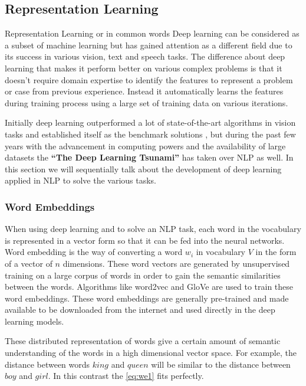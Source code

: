 \subsection{Representation Learning}\label{sec:dl}
Representation Learning or in common words Deep learning can be considered as a subset of machine learning but has gained attention as a different field due to its success in various vision, text and speech tasks. The difference about deep learning that makes it perform better on various complex problems is that it doesn't require domain expertise to identify the features to represent a problem or case from previous experience. Instead it automatically learns the features during training process using a large set of training data on various iterations. 

Initially deep learning outperformed a lot of state-of-the-art algorithms in vision tasks and established itself as the benchmark solutions \cite{simonyan2014very,he2016deep}, but during the past few years with the advancement in computing powers and the availability of large datasets the \textbf{``The Deep Learning Tsunami''} \cite{manning2015computational} has taken over NLP as well. In this section we will sequentially talk about the development of deep learning applied in NLP to solve the various tasks.

\subsubsection{Word Embeddings} \label{sec:word_emb}
When using deep learning and to solve an NLP task, each word in the vocabulary is represented in a vector form so that it can be fed into the neural networks. Word embedding is the way of converting a word $w_{i}$ in vocabulary $V$ in the form of a vector of $n$ dimensions. These word vectors are generated by unsupervised training on a large corpus of words in order to gain the semantic similarities between the words. Algorithms like word2vec \cite{mikolov2013distributed} and GloVe \cite{pennington2014glove} are used to train these word embeddings. These word embeddings are generally pre-trained and made available to be downloaded from the internet and used directly in the deep learning models.

These distributed representation of words give a certain amount of semantic understanding of the words in a high dimensional vector space. For example, the distance between words $king$ and $queen$ will be similar to the distance between $boy$ and $girl$. In this contrast the \cref{eq:we1} fits perfectly. 

